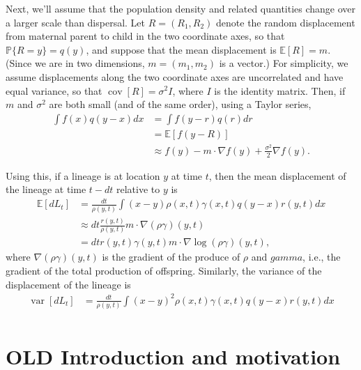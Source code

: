 \documentclass{article}
\renewcommand{\P}{\mathbb{P}}
\newcommand{\E}{\mathbb{E}}
\DeclareMathOperator{\var}{var}
\DeclareMathOperator{\cov}{cov}
\newcommand{\grad}{\nabla}
\newcommand{\details}[1]{\relax}
\begin{document}
Next, we'll assume that the population density and related quantities
change over a larger scale than dispersal.
Let $R = (R_1, R_2)$ denote the random displacement from maternal parent to child
in the two coordinate axes,
so that $\P\{R = y\} = q(y)$,
and suppose that the mean displacement is $\E[R] = m$.
(Since we are in two dimensions, $m = (m_1, m_2)$ is a vector.)
For simplicity, we assume displacements along the two coordinate axes 
are uncorrelated and have equal variance,
so that $\cov[R] = \sigma^2 I$, where $I$ is the identity matrix.
Then, if $m$ and $\sigma^2$ are both small (and of the same order),
using a Taylor series,
\begin{align*}
    \int f(x) q(y - x) dx
    &= \int f(y - r) q(r) dr \\
    &= \E[f(y - R)] \\
    &\approx f(y) - m \cdot \grad f(y) + \frac{\sigma^2}{2} \nabla f(y) .
\end{align*}
\details{(There is also a term $\sum_{ij} m_i m_j \partial_{ij} f(y)$, but it is second-order in $m$.)}

Using this, 
if a lineage is at location $y$ at time $t$,
then the mean displacement of the lineage at time $t - dt$ relative to $y$
is
\begin{align*}
    \E[dL_t]
    &=
    \frac{dt}{\rho(y, t)} \int (x - y) \rho(x, t) \gamma(x, t) q(y - x) r(y, t) dx \\
    &\approx
    dt \frac{r(y, t)}{\rho(y, t)} m \cdot \grad\left( \rho \gamma \right)(y, t) \\
    &=
    dt r(y, t) \gamma(y, t) m \cdot \grad \log\left(\rho \gamma \right)(y, t) ,
\end{align*}
where $\grad(\rho \gamma)(y,t)$ is the gradient of the produce of $\rho$ and $gamma$,
i.e., the gradient of the total production of offspring.
Similarly,
the variance of the displacement of the lineage is
\begin{align*}
    \var[dL_t]
    &=
    \frac{dt}{\rho(y, t)} \int (x - y)^2 \rho(x, t) \gamma(x, t) q(y - x) r(y, t) dx \\
\end{align*}




\section{OLD Introduction and motivation}
\end{document}
